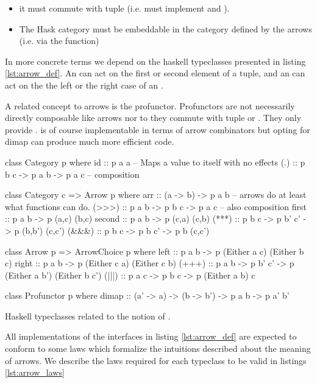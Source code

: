 \begin{itemize}
\item it must commute with tuple (i.e. must implement  and
  ).
\item The Hask category must be embeddable in the category defined by the
arrows (i.e. via the  function)
\end{itemize}

In more concrete terms we depend on the haskell typeclasses presented
in listing \ref{lst:arrow_def}. An  can act on the first
or second element of a tuple, and an  can act on the
the left or the right case of an .

A related concept to arrows is the profunctor. Profunctors are not
necessarily directly composable like arrows nor to they commute with
tuple or . They only provide . 
is of course implementable in terms of arrow combinators but opting
for dimap can produce much more efficient code.


\begin{code}
\begin{haskellcode}
class Category p where
  id :: p a a -- Maps a value to itself with no effects
  (.) :: p b c -> p a b -> p a c -- composition

class Category c => Arrow p where
  arr :: (a -> b) -> p a b -- arrows do at least what functions can do.
  (>>>) :: p a b -> p b c -> p a c -- also composition
  first :: p a b -> p (a,c) (b,c)
  second :: p a b -> p (c,a) (c,b)
  (***) :: p b c -> p b' c' -> p (b,b') (c,c')
  (&&&) :: p b c -> p b c' -> p b (c,c')

class Arrow p => ArrowChoice p where
  left :: p a b -> p (Either a c) (Either b c)
  right :: p a b -> p (Either c a) (Either c b)
  (+++) :: p a b -> p b' c' -> p (Either a b') (Either b c')
  (|||) :: p a c -> p b c -> p (Either a b) c

class Profunctor p where
  dimap :: (a' -> a) -> (b -> b') -> p a b -> p a' b'
\end{haskellcode}
  \caption{\label{lst:arrow_def}Haskell typeclasses related to the
    notion of .}
\end{code}


All implementations of the interfaces in listing \ref{lst:arrow_def}
are expected to conform to some laws which formalize the intuitions
described about the meaning of arrows. We describe the laws required
for each typeclass to be valid in listings \ref{lst:arrow_laws}

